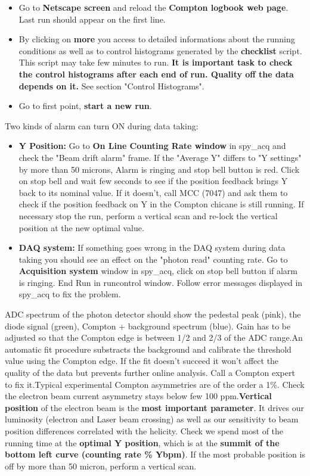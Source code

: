 {{\begin{itemize}
indicating that the run is saved and the online analysis (checklist) is 
runnig.
\item Go to {\bf Netscape screen} and reload the {\bf Compton logbook web 
page}. Last run should appear on the first line. 
\item By clicking on {\bf more} you access to detailed informations about 
the running conditions as well as to control histograms generated by the 
{\bf checklist} script. This script may take few minutes to run.
{\bf It is important task to check the control histograms after each end of 
run. Quality off the data depends on it.} See section "Control Histograms".
\item Go to first point, {\bf start a new run}. 
\end{itemize}

Two kinds of alarm can turn ON during data taking:

\begin{itemize}
\item {\bf Y Position:} Go to {\bf On Line Counting Rate window} in spy\_acq and check 
the "Beam drift alarm" frame. If the "Average Y" differs to "Y settings" by more than 
50 microns, Alarm is ringing and stop bell button is red. Click on stop bell and 
wait few seconds to see if the position feedback brings Y back to its nominal 
value. If it doesn't, call MCC (7047) and ask them to check if the position 
feedback on Y in the Compton chicane is still running.
If necessary stop the run, perform a vertical scan and re-lock the vertical 
position at the new optimal value.
\item {\bf DAQ system:} If something goes wrong in the DAQ system during data 
taking you should see an effect on the "photon read" counting rate. Go to 
{\bf Acquisition system} window in spy\_acq, click on stop bell button if alarm is 
ringing. End Run in runcontrol window. Follow error messages displayed in spy\_acq 
to fix the problem.
\end{itemize}

ADC spectrum of the photon detector should show the 
pedestal peak
(pink), the diode signal (green), Compton + background spectrum (blue). 
Gain has to be adjusted so that the Compton edge is between 1/2 and 2/3 
of the ADC range.An automatic fit procedure substracts the background and calibrate 
the threshold value using the Compton edge. If the fit doesn't succeed 
it won't affect the quality of the data but prevents further online 
analysis. Call a Compton expert to fix it.Typical experimental Compton asymmetries 
are of the order a 1\%. 
Check the electron beam current asymmetry stays below few 100 ppm.{\bf Vertical position} 
of the electron beam is the {\bf most important parameter}. 
It drives our luminosity (electron and Laser 
beam crossing) as well as our sensitivity to beam position differences 
correlated with the helicity.
Check we spend most of the running time at the {\bf optimal Y position}, 
which is at the {\bf summit of the bottom left curve (counting rate \% Ybpm)}.
If the most probable position is off by more than 50 micron, perform a 
vertical scan.


}}

